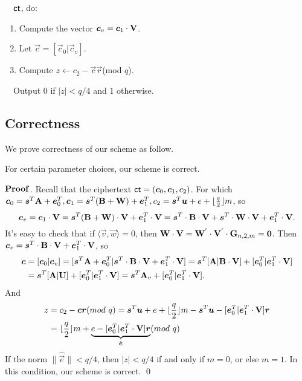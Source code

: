 ~~$\mathsf{ct}$, do:
\begin{enumerate}
\item Compute the vector $\boldsymbol{c}_{v}=\boldsymbol{c}_{1}\cdot \mathbf{V}$.\

\item Let $\vec{c}=[\vec{c}_{0}|\vec{c}_{v}]$.\

\item Compute $ z\leftarrow c_{2}-\vec{c}\vec{r}$(mod $q$).
\end{enumerate}
~~Output $0$ if $|z|<q/4$ and $1$ otherwise.\\[0.2cm]


\subsection{Correctness}
We prove correctness of our scheme as follow.
\begin{lemma}
For certain parameter choices, our scheme is correct.
\end{lemma}
\noindent $\mathbf{Proof}$. Recall that the ciphertext $\mathsf{ct}=(\boldsymbol{c}_{0},\boldsymbol{c}_{1},c_{2})$. For which $\boldsymbol{c}_{0}=\boldsymbol{s}^{T}\mathbf{A}+\boldsymbol{e}^{T}_{0},  \boldsymbol{c}_{1}=\boldsymbol{s}^{T}(\mathbf{B}+\mathbf{W})+\boldsymbol{e}^{T}_{1}, c_{2}=\boldsymbol{s}^{T}\boldsymbol{u}+e+\lfloor \frac{q}{2} \rfloor m$, so
\begin{equation}
\boldsymbol{c}_{v}=\boldsymbol{c}_{1}\cdot \mathbf{V}=\boldsymbol{s}^{T}(\mathbf{B}+\mathbf{W})\cdot \mathbf{V}+\boldsymbol{e}^{T}_{1}\cdot \mathbf{V}=\boldsymbol{s}^{T}\cdot \mathbf{B}\cdot \mathbf{V}+\boldsymbol{s}^{T}\cdot \mathbf{W}\cdot \mathbf{V}+
\boldsymbol{e}^{T}_{1}\cdot \mathbf{V}.
\end{equation}
It's easy to check that if $\langle \vec{v},\vec{w} \rangle=0$, then $\mathbf{W}\cdot \mathbf{V}=\mathbf{W}^{'}\cdot \mathbf{V}^{'}\cdot \mathbf{G}_{n,2,m}=\mathbf{0}$. Then $\boldsymbol{c}_{v}=\boldsymbol{s}^{T}\cdot \mathbf{B}\cdot \mathbf{V}+\boldsymbol{e}^{T}_{1}\cdot \mathbf{V}$, so
\begin{equation}
\begin{aligned}
\boldsymbol{c}&=[\boldsymbol{c}_{0}|\boldsymbol{c}_{v}]=[\boldsymbol{s}^{T}\mathbf{A}+\boldsymbol{e}^{T}_{0}|\boldsymbol{s}^{T}\cdot \mathbf{B}\cdot \mathbf{V}+\boldsymbol{e}^{T}_{1}\cdot \mathbf{V}]=\boldsymbol{s}^{T}[\mathbf{A}|\mathbf{B}\cdot \mathbf{V}]+[\boldsymbol{e}^{T}_{0}|\boldsymbol{e}^{T}_{1}\cdot \mathbf{V}]\\
&=\boldsymbol{s}^{T}[\mathbf{A}|\mathbf{U}]+[\boldsymbol{e}^{T}_{0}|\boldsymbol{e}^{T}_{1}\cdot \mathbf{V}]=\boldsymbol{s}^{T}\mathbf{A}_{v}+[\boldsymbol{e}^{T}_{0}|\boldsymbol{e}^{T}_{1}\cdot \mathbf{V}].
\end{aligned}
\end{equation}
And
\begin{equation}
\begin{aligned}
z&=c_{2}-\boldsymbol{c}\boldsymbol{r}(mod\ q)=\boldsymbol{s}^{T}\boldsymbol{u}+e+\lfloor \frac{q}{2} \rfloor m-\boldsymbol{s}^{T}\boldsymbol{u}-[\boldsymbol{e}^{T}_{0}|\boldsymbol{e}^{T}_{1}\cdot \mathbf{V}]\boldsymbol{r}\\
&=\lfloor \frac{q}{2} \rfloor m+\underbrace{e-[\boldsymbol{e}^{T}_{0}|\boldsymbol{e}^{T}_{1}\cdot \mathbf{V}]\boldsymbol{r}}_{\hat{\boldsymbol{e}}}(mod\ q)
\end{aligned}
\end{equation}
If the norm $\|\hat{\vec{e}}\|< q/4$, then $|z|< q/4$ if and only if $m=0$, or else $m=1$. In this condition, our scheme is correct.  \qed
